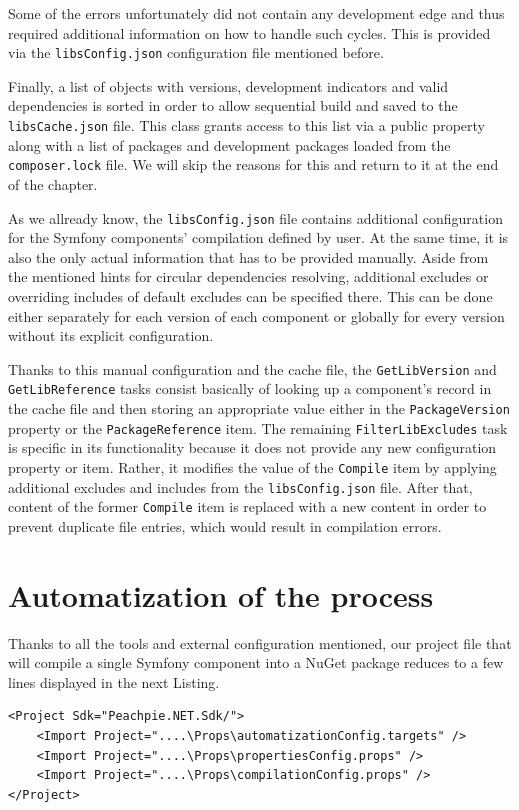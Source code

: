 Some of the errors unfortunately did not contain any development edge and thus required additional information on how to handle such cycles. This is provided via the \texttt{libsConfig.json} configuration file mentioned before.

Finally, a list of objects with versions, development indicators and valid dependencies is sorted in order to allow sequential build and saved to the \texttt{libsCache.json} file. This class grants access to this list via a public property along with a list of packages and development packages  loaded from the \texttt{composer.lock} file. We will skip the reasons for this and return to it at the end of the chapter.

As we allready know, the \texttt{libsConfig.json} file contains additional configuration for the Symfony components' compilation defined by user. At the same time, it is also the only actual information that has to be provided manually. Aside from the mentioned hints for circular dependencies resolving, additional excludes or overriding includes of default excludes can be specified there. This can be done either separately for each version of each component or globally for every version without its explicit configuration. 

Thanks to this manual configuration and the cache file, the \texttt{GetLibVersion} and \texttt{GetLibReference} tasks consist basically of looking up a component's record in the cache file and then storing an appropriate value either in the \texttt{PackageVersion} property or the \texttt{PackageReference} item. The remaining \texttt{FilterLibExcludes} task is specific in its functionality because it does not provide any new configuration property or item. Rather, it modifies the value of the \texttt{Compile} item by applying additional excludes and includes from the \texttt{libsConfig.json} file. After that, content of the former \texttt{Compile} item is replaced with a new content in order to prevent duplicate file entries, which would result in compilation errors.


\section{Automatization of the process}
Thanks to all the tools and external configuration mentioned, our project file that will compile a single Symfony component into a NuGet package reduces to a few lines displayed in the next Listing.

\begin{center}
\begin{lstlisting}[caption={compilationConfig.props},captionpos=b]
<Project Sdk="Peachpie.NET.Sdk/">      
    <Import Project="....\Props\automatizationConfig.targets" />
    <Import Project="....\Props\propertiesConfig.props" />   
    <Import Project="....\Props\compilationConfig.props" />
</Project>
\end{lstlisting}
\end{center}

